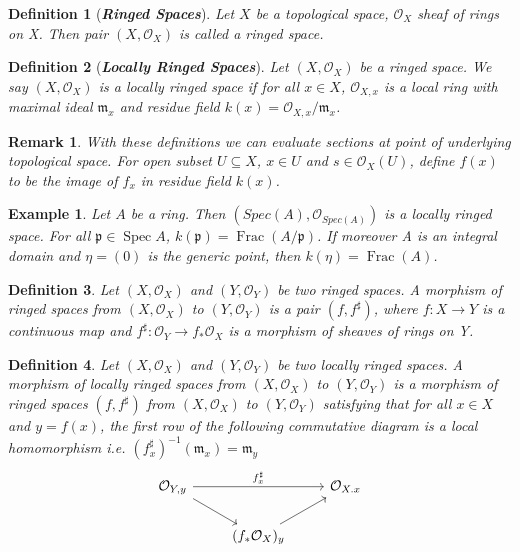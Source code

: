 \documentclass{ctexart}
\newtheorem{definition}{Definition}[section]
\newtheorem{remark}{Remark}[section]
\newtheorem{example}{Example}[section]
\newcommand{\spec}{\operatorname{Spec}}
\newcommand{\fraction}{\operatorname{Frac}}
\begin{document}
\begin{definition}[\textbf{\emph{Ringed Spaces}}]
    Let $X$ be a topological space, $\mathcal{O}_{X}$ sheaf of rings on X.
    Then pair $(X, \mathcal{O}_{X})$ is called a ringed space.
\end{definition}
\begin{definition}[\textbf{\emph{Locally Ringed Spaces}}]
    Let $(X, \mathcal{O}_{X})$ be a ringed space.
    We say $(X, \mathcal{O}_{X})$ is a locally ringed space if for all $x\in X$, 
    $\mathcal{O}_{X, x}$ is a local ring with maximal ideal $\mathfrak{m}_{x}$ and residue field $k(x) = \mathcal{O}_{X, x}/\mathfrak{m}_{x}$.
\end{definition}
\begin{remark}
    With these definitions we can evaluate sections at point of underlying topological space.
    For open subset $U \subseteq X$, $x\in U$ and $s\in \mathcal{O}_{X}(U)$, define $f(x)$ to be the image of $f_{x}$ in residue field $k(x)$.
\end{remark}
\begin{example}
    Let $A$ be a ring.
    Then $(Spec(A), \mathcal{O}_{Spec(A)})$ is a locally ringed space.
    For all $\mathfrak{p}\in \spec A$, $k(\mathfrak{p}) = \fraction(A/\mathfrak{p})$.
    If moreover A is an integral domain and $\eta = (0)$ is the generic point, then $k(\eta) = \fraction(A)$.
\end{example}
\begin{definition}
    Let $(X, \mathcal{O}_{X})$ and $(Y, \mathcal{O}_{Y})$ be two ringed spaces.
    A morphism of ringed spaces from $(X, \mathcal{O}_{X})$ to $(Y, \mathcal{O}_{Y})$ is a pair $(f, f^{\sharp})$,
    where $f: X \longrightarrow Y$ is a continuous map and $f^{\sharp}: \mathcal{O}_{Y} \longrightarrow f_{\ast}\mathcal{O}_{X}$ is a morphism of sheaves of rings on Y.
\end{definition}
\begin{definition}
    Let $(X, \mathcal{O}_{X})$ and $(Y, \mathcal{O}_{Y})$ be two locally ringed spaces.
    A morphism of locally ringed spaces from $(X, \mathcal{O}_{X})$ to $(Y, \mathcal{O}_{Y})$ is a morphism of ringed spaces $(f, f^{\sharp})$ from $(X, \mathcal{O}_{X})$ to $(Y, \mathcal{O}_{Y})$ satisfying that for all $x\in X$ and $y = f(x)$,
    the first row of the following commutative diagram is a local homomorphism i.e. $(f_{x}^{\sharp})^{-1}(\mathfrak{m}_{x}) = \mathfrak{m}_{y}$
    \begin{equation*}
        \begin{tikzcd}
            \mathcal{O}_{Y, y} \arrow[rr, "f_{x}^{\sharp}"] \arrow[dr] &&
            \mathcal{O}_{X. x} \\
            & (f_{\ast}\mathcal{O}_{X})_{y} \arrow[ur] &
        \end{tikzcd}
    \end{equation*}
\end{definition}
\end{document}
